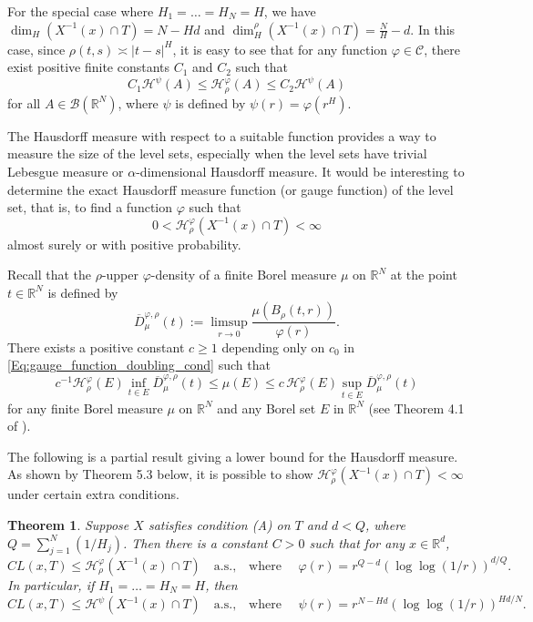 \documentclass[11pt, reqno]{amsart}
\newtheorem{theorem}{Theorem}[section]
\def\R{{\mathbb R}}
\numberwithin{equation}{section}
\begin{document}
For the special case where $H_1 = \dots = H_N = H$, we have $\dim_H(X^{-1}(x) \cap T) = N - Hd$ and 
$\dim_H^\rho(X^{-1}(x) \cap T) = \frac{N}{H}  - d$. In this case, since $\rho(t, s) \asymp |t - s|^H$, it is easy to 
see that for any function $\varphi \in \mathscr{C}$, there exist positive finite constants $C_1$ and $C_2$ such that 
\begin{equation}\label{compare_Haus_meas}
C_1\mathcal{H}^\psi(A) \le \mathcal{H}^\varphi_\rho(A) \le C_2 \mathcal{H}^\psi(A)
\end{equation}
for all $A \in \mathscr{B}(\R^N)$, where $\psi$ is defined by $\psi(r) = \varphi(r^H)$.

The Hausdorff measure with respect to a suitable function provides a way to measure the size of the level sets, 
especially when the level sets have trivial Lebesgue measure or $\alpha$-dimensional Hausdorff measure. 
It would be interesting to determine the exact Hausdorff measure function (or gauge function) of the level set, 
that is, to find a function $\varphi$ such that 
\[ 0 < \mathcal{H}^\varphi_\rho(X^{-1}(x) \cap T) < \infty \]
almost surely or with positive probability.

Recall that the $\rho$-upper $\varphi$-density of a finite Borel measure $\mu$ on $\R^N$ at the point $t \in \R^N$ is defined by
\[ \overline{D}^{\varphi, \rho}_\mu(t) := \limsup_{r \to 0} \frac{\mu(B_\rho(t, r))}{\varphi(r)}. \]
There exists a positive constant $c \ge 1$ depending only on $c_0$ in \eqref{Eq:gauge_function_doubling_cond} such that 
\begin{equation}\label{Eq:upper_density}
c^{-1} \mathcal{H}^\varphi_\rho(E) \inf_{t \in E}\overline{D}^{\varphi, \rho}_\mu(t)
\le \mu(E) \le c\, \mathcal{H}^\varphi_\rho(E) \sup_{t \in E}\overline{D}^{\varphi, \rho}_\mu(t)
\end{equation}
for any finite Borel measure $\mu$ on $\R^N$ and any Borel set $E$ in $\R^N$ (see Theorem 4.1 of \cite{WX11}).

The following is a partial result giving a lower bound for the Hausdorff measure. As shown by Theorem 5.3 below, it is
possible to show $\mathcal{H}^\varphi_\rho(X^{-1}(x) \cap T) < \infty$ under certain extra conditions.   

\begin{theorem}\label{Thm:Haus_meas_level_set}
Suppose $X$ satisfies condition \textup{(A)} on $T$ and $d < Q$, where $Q = \sum_{j=1}^N (1/H_j)$.
Then there is a constant $C > 0$ such that for any $x \in \R^d$, 
\[ C L(x, T) \le \mathcal{H}^\varphi_\rho(X^{-1}(x) \cap T) \quad \text{a.s.,} \quad \text{where }\quad \varphi(r) = r^{Q-d} (\log\log(1/r))^{d/Q}. \]
In particular, if $H_1 = \dots = H_N = H$, then
\[ C L(x, T) \le \mathcal{H}^\psi(X^{-1}(x) \cap T) \quad \text{a.s.,} \quad \text{where }\quad \psi(r) = r^{N-Hd} (\log\log(1/r))^{Hd/N}. \]
\end{theorem}
\end{document}
